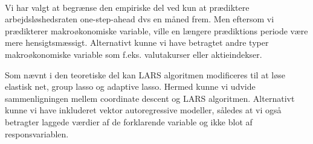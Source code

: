 \paragraph{}
Vi har valgt at begrænse den empiriske del ved kun at prædiktere arbejdsløshedsraten one-step-ahead dvs en måned frem.
Men eftersom vi prædikterer makroøkonomiske variable, ville en længere prædiktions periode være mere hensigtsmæssigt.
Alternativt kunne vi have betragtet andre typer makroøkonomiske variable som f.eks. valutakurser eller aktieindekser.

Som nævnt i den teoretiske del kan LARS algoritmen modificeres til at løse elastisk net, group lasso og adaptive lasso.
Hermed kunne vi udvide sammenligningen mellem coordinate descent og LARS algoritmen.
Alternativt kunne vi have inkluderet vektor autoregressive modeller, således at vi også betragter laggede værdier af de forklarende variable og ikke blot af responsvariablen.
